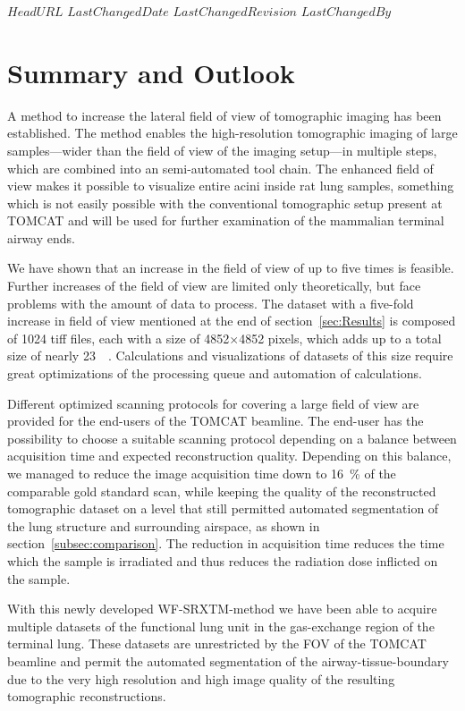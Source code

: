 \svnidlong
{$HeadURL$}
{$LastChangedDate$}
{$LastChangedRevision$}
{$LastChangedBy$}
%
\section{Summary and Outlook}\label{summary and outlook}

A method to increase the lateral field of view of tomographic imaging has been established. The method enables the high-resolution tomographic imaging of large samples---wider than the field of view of the imaging setup---in multiple steps, which are combined into an semi-automated tool chain. The enhanced field of view makes it possible to visualize entire acini inside rat lung samples, something which is not easily possible with the conventional tomographic setup present at TOMCAT and will be used for further examination of the mammalian terminal airway ends.

We have shown that an increase in the field of view of up to five times is feasible. Further increases of the field of view are limited only theoretically, but face problems with the amount of data to process. The dataset with a five-fold increase in field of view mentioned at the end of section~\ref{sec:Results} is composed of 1024 tiff files, each with a size of 4852$\times$4852 pixels, which adds up to a total size of nearly \SI{23}{\giga\byte}. Calculations and visualizations of datasets of this size require great optimizations of the processing queue and automation of calculations.

Different optimized scanning protocols for covering a large field of view are provided for the end-users of the TOMCAT beamline. The end-user has the possibility to choose a suitable scanning protocol depending on a balance between acquisition time and expected reconstruction quality. Depending on this balance, we managed to reduce the image acquisition time down to \SI{16}{\percent} of the comparable gold standard scan, while keeping the quality of the reconstructed tomographic dataset on a level that still permitted automated segmentation of the lung structure and surrounding airspace, as shown in section~\ref{subsec:comparison}. The reduction in acquisition time reduces the time which the sample is irradiated and thus reduces the radiation dose inflicted on the sample. 

With this newly developed WF-SRXTM-method we have been able to acquire multiple datasets of the functional lung unit in the gas-exchange region of the terminal lung. These datasets are unrestricted by the FOV of the TOMCAT beamline and permit the automated segmentation of the airway-tissue-boundary due to the very high resolution and high image quality of the resulting tomographic reconstructions.